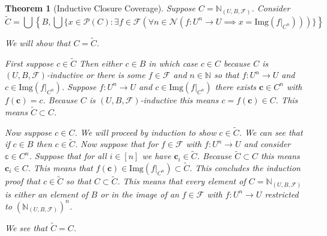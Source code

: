 \documentclass[12pt]{article}
\theoremstyle{break}
\theoremstyle{break}
\newtheorem{theorem}{Theorem}[section]
\theoremstyle{break}
\theoremstyle{break}
\theoremstyle{break}
\newtheorem{informal definition}[definition]{Informal Definition}
\newcommand{\bv}[1]{\boldsymbol{#1}}
\begin{document}
\begin{theorem}[Inductive Closure Coverage]
Suppose $C = \mathbb{N}_{(U, B, \mathcal{F})}$.
Consider
$$
\tilde{C} = \bigcup\left\{B, \bigcup\{x\in \mathcal{P}(C): \exists f \in \mathcal{F}(\forall n \in \mathcal{N}(f:U^n \to U \implies x = \text{Img}(f|_{C^n})))\}\right\}
$$

We will show that $C = \tilde{C}$.

First suppose $c\in \tilde{C}$
Then either $c\in B$ in which case $c\in C$ because $C$ is $(U, B, \mathcal{F})$-inductive or there is some $f\in \mathcal{F}$ and $n\in \mathbb{N}$ so that $f:U^n \to U$ and $c\in \text{Img}(f|_{C^n})$.
Suppose $f:U^n \to U$ and $c \in \text{Img}(f|_{C^n})$ there exists $\bv{c}\in C^n$ with $f(\bv{c}) = c$.
Because $C$ is $(U, B, \mathcal{F})$-inductive this means $c = f(\bv{c}) \in C$.
This means $\tilde{C} \subset C$.

Now suppose $c\in C$.
We will proceed by induction to show $c\in \tilde{C}$.
We can see that if $c\in B$ then $c\in \tilde{C}$.
Now suppose that for $f\in \mathcal{F}$ with $f:U^n \to U$ and consider $\mathbb{c}\in C^n$.
Suppose that for all $i \in [n]$ we have $\bv{c}_i \in \tilde{C}$.
Because $\tilde{C} \subset C$ this means $\bv{c}_i \in C$.
This means that $f(\bv{c})\in \text{Img}(f|_{C^n}) \subset \tilde{C}$.
This concludes the induction proof that $c\in \tilde{C}$ so that $C \subset \tilde{C}$.
This means that every element of $C = \mathbb{N}_{(U, B, \mathcal{F})}$ is either an element of $B$ or in the image of an $f\in \mathcal{F}$ with $f:U^n \to U$ restricted to $(\mathbb{N}_{(U, B, \mathcal{F})})^n$.

We see that $\tilde{C} = C$.
\end{theorem}
\end{document}
